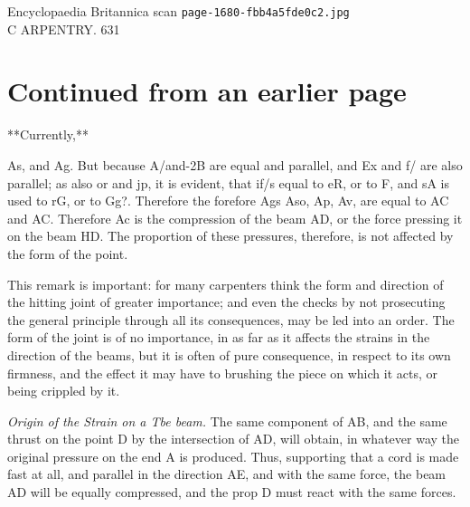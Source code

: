 \documentclass{article}
\begin{document}
\begin{center}
{\Large Encyclopaedia Britannica scan \texttt{page-1680-fbb4a5fde0c2.jpg}}\\[0.5em]
C ARPENTRY. 631
\end{center}
\section*{Continued from an earlier page}
**Currently,**

As, and Ag. But because A/and-2B are equal and parallel, and Ex and f/ are also parallel; as also or and jp, it is evident, that if/s equal to eR, or to F, and sA is used to rG, or to Gg?. Therefore the forefore Ags Aso, Ap, Av, are equal to AC and AC. Therefore Ac is the compression of the beam AD, or the force pressing it on the beam HD. The proportion of these pressures, therefore, is not affected by the form of the point.

This remark is important: for many carpenters think the form and direction of the hitting joint of greater importance; and even the checks by not prosecuting the general principle through all its consequences, may be led into an order. The form of the joint is of no importance, in as far as it affects the strains in the direction of the beams, but it is often of pure consequence, in respect to its own firmness, and the effect it may have to brushing the piece on which it acts, or being crippled by it.

\textit{Origin of the Strain on a Tbe beam.}
The same component of AB, and the same thrust on the point D by the intersection of AD, will obtain, in whatever way the original pressure on the end A is produced. Thus, supporting that a cord is made fast at all, and parallel in the direction AE, and with the same force, the beam AD will be equally compressed, and the prop D must react with the same forces.
\end{document}
